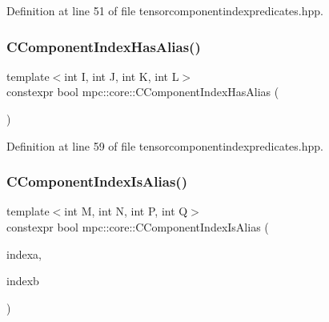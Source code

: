 Definition at line 51 of file tensorcomponentindexpredicates.\+hpp.

\mbox{\label{namespacempc_1_1core_a406506b84ea67d4832c875f28d06ac77}} 
\subsubsection{\texorpdfstring{C\+Component\+Index\+Has\+Alias()}{CComponentIndexHasAlias()}\hspace{0.1cm}{\footnotesize\ttfamily [4/4]}}
{\footnotesize\ttfamily template$<$int I, int J, int K, int L$>$ \\
constexpr bool mpc\+::core\+::\+C\+Component\+Index\+Has\+Alias (\begin{DoxyParamCaption}{ }\end{DoxyParamCaption})\hspace{0.3cm}{\ttfamily [inline]}}



Definition at line 59 of file tensorcomponentindexpredicates.\+hpp.

\mbox{\label{namespacempc_1_1core_ad146cbb32d70eee93b789db71d9d5e87}} 
\subsubsection{\texorpdfstring{C\+Component\+Index\+Is\+Alias()}{CComponentIndexIsAlias()}\hspace{0.1cm}{\footnotesize\ttfamily [1/4]}}
{\footnotesize\ttfamily template$<$int M, int N, int P, int Q$>$ \\
constexpr bool mpc\+::core\+::\+C\+Component\+Index\+Is\+Alias (\begin{DoxyParamCaption}\item[{const \mbox{\hyperlink{classmpc_1_1core_1_1_c_tensor_rank2_component_index}{mpc\+::core\+::\+C\+Tensor\+Rank2\+Component\+Index}}$<$ M, N $>$ \&}]{indexa,  }\item[{const \mbox{\hyperlink{classmpc_1_1core_1_1_c_tensor_rank2_component_index}{mpc\+::core\+::\+C\+Tensor\+Rank2\+Component\+Index}}$<$ P, Q $>$ \&}]{indexb }\end{DoxyParamCaption})\hspace{0.3cm}{\ttfamily [inline]}}



